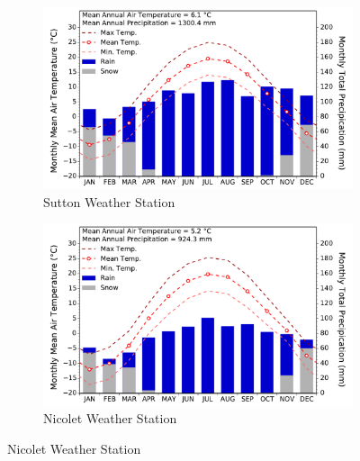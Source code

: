 \documentclass[TechnicalNoteMeteo.tex]{subfiles}
\begin{document}
\begin{figure}[bh!]      
        
    \begin{subfigure}{0.45\textwidth}
        \includegraphics[width=\textwidth]{img/weather_normals_sutton}
        \caption{Sutton Weather Station}
    \end{subfigure} 
    \hspace{0.04\textwidth}   
    \begin{subfigure}{0.45\textwidth}
        \includegraphics[width=\textwidth]{img/weather_normals_nicolet}
        \caption{Nicolet Weather Station}
    \end{subfigure}
    
    \vspace{1cm}   
    

\end{figure}
\end{document}
